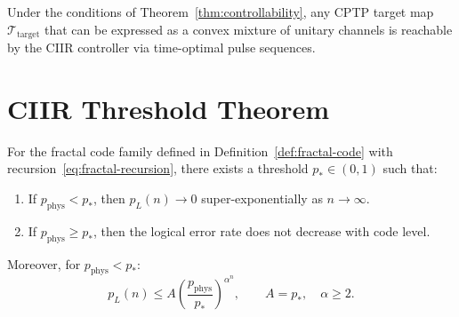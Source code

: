 \begin{corollary}
Under the conditions of Theorem~\ref{thm:controllability}, any CPTP
target map $\mathcal{T}_{\mathrm{target}}$ that can be expressed as a
convex mixture of unitary channels is reachable by the CIIR controller
via time-optimal pulse sequences.
\end{corollary}

\section{CIIR Threshold Theorem}
\label{sec:ch21-threshold}

\begin{theorem}\label{thm:threshold}
For the fractal code family defined in Definition~\ref{def:fractal-code}
with recursion~\eqref{eq:fractal-recursion}, there exists a threshold
$p_* \in (0, 1)$ such that:
\begin{enumerate}[label=(\roman*), nosep]
  \item If $p_{\mathrm{phys}} < p_*$, then
        $p_L(n) \to 0$ super-exponentially as $n \to \infty$.
  \item If $p_{\mathrm{phys}} \geq p_*$, then the logical error rate
        does not decrease with code level.
\end{enumerate}
Moreover, for $p_{\mathrm{phys}} < p_*$:
\begin{equation}\label{eq:pL-bound}
  p_L(n) \leq A\!\left(\frac{p_{\mathrm{phys}}}{p_*}\right)^{\!\alpha^n},
  \qquad A = p_*, \quad \alpha \geq 2.
\end{equation}
\end{theorem}

